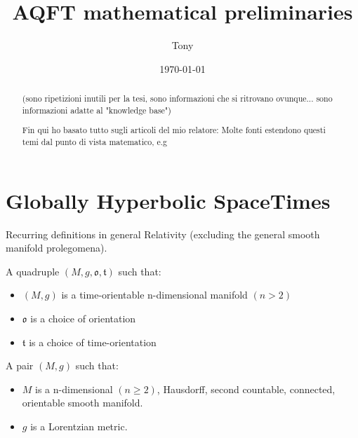 \documentclass[a4paper,12pt]{scrartcl}    %
\begin{document}
	\title{AQFT mathematical preliminaries}
	\author{Tony}
	\date{\today}
\maketitle

\tableofcontents

\begin{abstract}
		(sono ripetizioni inutili per la tesi, sono informazioni che si ritrovano ovunque... sono informazioni adatte al "knowledge base")
		
		Fin qui ho basato tutto sugli articoli del mio relatore: \cite{primer}\cite{advances} 
		Molte fonti estendono questi temi dal punto di vista matematico, e.g \cite{bar}
\end{abstract}

\newpage
\section{Globally Hyperbolic SpaceTimes}
	Recurring definitions in general Relativity (excluding the general smooth manifold prolegomena).

	\begin{definition}[SpaceTime]
		A quadruple $(M, g, \mathfrak{o}, \mathfrak{t})$ such that:
		\begin{itemize}
			\item $(M,g)$ is a time-orientable n-dimensional manifold $(n>2)$
			\item $\mathfrak{o}$ is a choice of orientation
			\item $\mathfrak{t}$ is a choice of time-orientation
		\end{itemize}
	\end{definition}

	\begin{definition}
		A pair $(M, g)$ such that:
		\begin{itemize}
			\item $M$ is a n-dimensional $(n\geq2)$, Hausdorff, second countable, connected, orientable smooth manifold.
			\item $g$ is a Lorentzian metric.
		\end{itemize}
	\end{definition}
			
\end{document}
